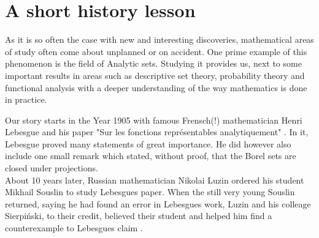 \documentclass[10pt, a4paper, titlepage]{article}
\numberwithin{equation}{section}
\begin{document}
\hypersetup{pageanchor=false}


\newpage

\thispagestyle{empty}



\newpage

\thispagestyle{empty}
\tableofcontents

\newpage
\hypersetup{pageanchor=true}
\renewcommand{\thepage}{ \arabic{page} }

\setcounter{page}{1}
\onehalfspacing







\section{A short history lesson}
As it is so often the case with new and interesting discoveries, mathematical areas of study often come about unplanned or on accident. 
One prime example of this phenomenon is the field of Analytic sets. 
Studying it provides us, next to some important results in areas such as descriptive set theory, probability theory and functional analysis with a deeper understanding of the way mathematics is done in practice.

Our story starts in the Year 1905 with famous Frensch(!) mathematician Henri Lebesgue and his paper "Sur les fonctions représentables analytiquement" \cite{lebesgue1905}. 
In it, Lebesgue proved many statements of great importance. 
He did however also include one small remark which stated, without proof, that the Borel sets are closed under projections. \\
About 10 years later, Russian mathematician Nikolai Luzin ordered his student Mikhail Souslin to study Lebesgues paper. 
When the still very young Souslin returned, saying he had found an error in Lebesgues work, Luzin and his colleage Sierpiński, to their credit, believed their student and helped him find a counterexample to Lebesgues claim \cite{sierpinski1950}.
\end{document}
